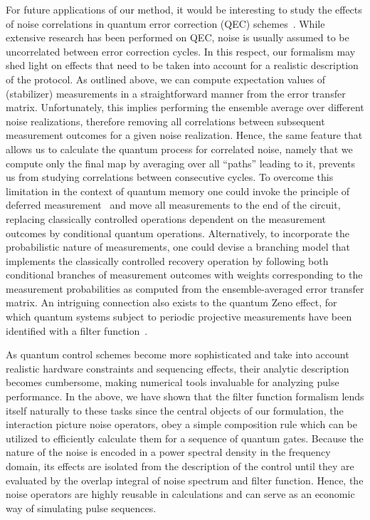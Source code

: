 For future applications of our method, it would be interesting to study the effects of noise correlations in quantum error correction (QEC) schemes~\cite{Devitt2013,Ng2011,Nickerson2019}. %
While extensive research has been performed on QEC, noise is usually assumed to be uncorrelated between error correction cycles.
In this respect, our formalism may shed light on effects that need to be taken into account for a realistic description of the protocol.
As outlined above, we can compute expectation values of (stabilizer) measurements in a straightforward manner from the error transfer matrix.
Unfortunately, this implies performing the ensemble average over different noise realizations, therefore removing all correlations between subsequent measurement outcomes for a given noise realization.
Hence, the same feature that allows us to calculate the quantum process for correlated noise, namely that we compute only the final map by averaging over all \enquote{paths} leading to it, prevents us from studying correlations between consecutive cycles.
To overcome this limitation in the context of quantum memory one could invoke the principle of deferred measurement~\cite{Nielsen2011} and move all measurements to the end of the circuit, replacing classically controlled operations dependent on the measurement outcomes by conditional quantum operations.
Alternatively, to incorporate the probabilistic nature of measurements, one could devise a branching model that implements the classically controlled recovery operation by following both conditional branches of measurement outcomes with weights corresponding to the measurement probabilities as computed from the ensemble-averaged error transfer matrix.
An intriguing connection also exists to the quantum Zeno effect, for which quantum systems subject to periodic projective measurements have been identified with a filter function~\cite{Kofman2000,Kofman2001,Chaudhry2016}.

As quantum control schemes become more sophisticated and take into account realistic hardware constraints and sequencing effects, their analytic description becomes cumbersome, making numerical tools invaluable for analyzing pulse performance.
In the above, we have shown that the filter function formalism lends itself naturally to these tasks since the central objects of our formulation, the interaction picture noise operators, obey a simple composition rule which can be utilized to efficiently calculate them for a sequence of quantum gates.
Because the nature of the noise is encoded in a power spectral density in the frequency domain, its effects are isolated from the description of the control until they are evaluated by the overlap integral of noise spectrum and filter function.
Hence, the noise operators are highly reusable in calculations and can serve as an economic way of simulating pulse sequences.

